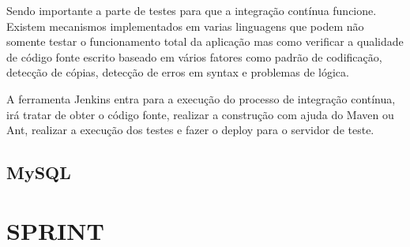 \documentclass{abnt}
\begin{document}
				Sendo importante a parte de testes para que a integração contínua funcione. Existem mecanismos implementados em
				varias linguagens que podem não somente testar o funcionamento total da aplicação mas como verificar a qualidade de
				código fonte escrito baseado em vários fatores como padrão de codificação, detecção de cópias, detecção de erros em
				syntax e problemas de lógica.
				
				A ferramenta Jenkins entra para a execução do processo de integração contínua, irá tratar de obter o código fonte,
				realizar a construção com ajuda do Maven ou Ant, realizar a execução dos testes e fazer o deploy para o servidor de
				teste.
	
	\section{MySQL}
	\blindtext
	

\clearpage
\chapter{SPRINT}
	
	\blindtext

\clearpage
\nocite{*}

%		
		
\end{document}
